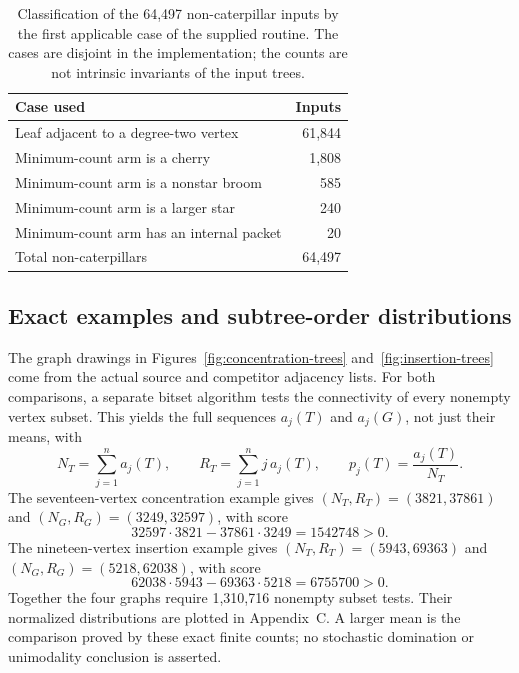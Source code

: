 \documentclass[11pt,reqno]{amsart}
\theoremstyle{plain}
\begin{document}
\begin{table}[tbp]
\caption{Classification of the 64,497 non-caterpillar inputs by the first
applicable case of the supplied routine. The cases are disjoint in the
implementation; the counts are not intrinsic invariants of the input trees.}
\label{tab:cases}\centering\small
\begin{tabular}{@{}lr@{}}
\toprule
Case used & Inputs \\
\midrule
Leaf adjacent to a degree-two vertex & 61,844 \\
Minimum-count arm is a cherry & 1,808 \\
Minimum-count arm is a nonstar broom & 585 \\
Minimum-count arm is a larger star & 240 \\
Minimum-count arm has an internal packet & 20 \\
\midrule
Total non-caterpillars & 64,497 \\
\bottomrule
\end{tabular}
\end{table}

\subsection{Exact examples and subtree-order distributions}
The graph drawings in Figures~\ref{fig:concentration-trees}
and~\ref{fig:insertion-trees} come from the actual source and competitor
adjacency lists. For both comparisons, a separate bitset algorithm tests the
connectivity of every nonempty vertex subset. This yields the full sequences
$a_j(T)$ and $a_j(G)$, not just their means, with
\[
 N_T=\sum_{j=1}^{n}a_j(T),\qquad
 R_T=\sum_{j=1}^{n}j\,a_j(T),\qquad
 p_j(T)=\frac{a_j(T)}{N_T}.
 \tag{6.3}\label{eq:empirical-distribution}
\]
The seventeen-vertex concentration example gives
$(N_T,R_T)=(3821,37861)$ and $(N_G,R_G)=(3249,32597)$, with score
\[
  32597\cdot3821-37861\cdot3249=1542748>0.
\]
The nineteen-vertex insertion example gives
$(N_T,R_T)=(5943,69363)$ and $(N_G,R_G)=(5218,62038)$, with score
\[
  62038\cdot5943-69363\cdot5218=6755700>0.
\]
Together the four graphs require 1,310,716 nonempty subset tests. Their
normalized distributions are plotted in Appendix~C. A larger mean is the
comparison proved by these exact finite counts; no stochastic domination or
unimodality conclusion is asserted.
\end{document}
